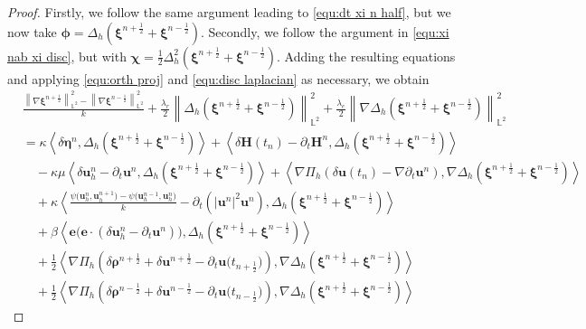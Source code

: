 \documentclass[11pt, reqno]{amsart}
\theoremstyle{definition}
\theoremstyle{remark}
\numberwithin{equation}{section}
\newcommand{\bff}{\boldsymbol}
\newcommand{\bb}{\mathbb}
\newcommand{\norm}[2]{\left\|{#1}\right\|_{#2}}
\newcommand{\inpro}[2]{\left\langle#1,#2\right\rangle}
\newcommand{\abs}[1]{\left|{#1}\right|}
\begin{document}
\begin{proof}
Firstly, we follow the same argument leading to \eqref{equ:dt xi n half}, but we now take $\bff{\phi}=\Delta_h \left(\bff{\xi}^{n+\frac{1}{2}}+ \bff{\xi}^{n-\frac{1}{2}}\right)$. Secondly, we follow the argument in \eqref{equ:xi nab xi disc}, but with $\bff{\chi}=\frac{1}{2} \Delta_h^2 \left(\bff{\xi}^{n+\frac{1}{2}}+ \bff{\xi}^{n-\frac{1}{2}}\right)$. Adding the resulting equations and applying \eqref{equ:orth proj} and \eqref{equ:disc laplacian} as necessary, we obtain
\begin{align}\label{equ:dt nab xi n half}
	\nonumber
	&\frac{\norm{\nabla \bff{\xi}^{n+\frac{1}{2}}}{\bb{L}^2}^2 - \norm{\nabla \bff{\xi}^{n-\frac{1}{2}}}{\bb{L}^2}^2}{k}
	+\frac{\lambda_r}{2} \norm{\Delta_h\left(\bff{\xi}^{n+\frac{1}{2}}+\bff{\xi}^{n-\frac{1}{2}}\right)}{\bb{L}^2}^2
	+
	\frac{\lambda_e}{2} \norm{\nabla \Delta_h\left(\bff{\xi}^{n+\frac{1}{2}}+\bff{\xi}^{n-\frac{1}{2}}\right)}{\bb{L}^2}^2
	\\
	\nonumber
	&=
	\kappa \inpro{\delta \bff{\eta}^n}{\Delta_h \left(\bff{\xi}^{n+\frac{1}{2}}+ \bff{\xi}^{n-\frac{1}{2}}\right)}
	+
	\inpro{\delta \bff{H}(t_n) - \partial_t \bff{H}^n}{\Delta_h \left(\bff{\xi}^{n+\frac{1}{2}}+ \bff{\xi}^{n-\frac{1}{2}}\right)}
	\\
	\nonumber
	&\quad
	-
	\kappa\mu \inpro{\delta \bff{u}_h^n-\partial_t \bff{u}^n}{\Delta_h \left(\bff{\xi}^{n+\frac{1}{2}}+ \bff{\xi}^{n-\frac{1}{2}}\right)}
	+
	\inpro{\nabla \Pi_h \left(\delta \bff{u}(t_n) - \nabla\partial_t \bff{u}^n\right)}{\nabla \Delta_h \left(\bff{\xi}^{n+\frac{1}{2}}+ \bff{\xi}^{n-\frac{1}{2}}\right)}
	\\
	\nonumber
	&\quad
	+
	\kappa
	\inpro{\frac{\psi\big(\bff{u}_h^n,\bff{u}_h^{n+1}\big) - \psi\big(\bff{u}_h^{n-1}, \bff{u}_h^n\big)}{k} - \partial_t \left(\abs{\bff{u}^n}^2 \bff{u}^n\right)}{\Delta_h \left(\bff{\xi}^{n+\frac{1}{2}}+ \bff{\xi}^{n-\frac{1}{2}}\right)}
	\\
	\nonumber
	&\quad
	+
	\beta
	\inpro{\bff{e}\big(\bff{e}\cdot(\delta\bff{u}_h^n-\partial_t \bff{u}^n)\big)}{\Delta_h \left(\bff{\xi}^{n+\frac{1}{2}}+ \bff{\xi}^{n-\frac{1}{2}}\right)}
	\\
	\nonumber
	&\quad
	+
	\frac{1}{2} \inpro{\nabla \Pi_h \left(\delta \bff{\rho}^{n+\frac{1}{2}}+ \delta \bff{u}^{n+\frac{1}{2}} - \partial_t \bff{u}\big(t_{n+\frac{1}{2}}\big)\right)}{\nabla \Delta_h\left(\bff{\xi}^{n+\frac{1}{2}}+\bff{\xi}^{n-\frac{1}{2}}\right)}
	\\
	\nonumber
	&\quad
	+
	\frac{1}{2} \inpro{\nabla \Pi_h \left(\delta \bff{\rho}^{n-\frac{1}{2}} + \delta \bff{u}^{n-\frac{1}{2}} - \partial_t \bff{u}\big(t_{n-\frac{1}{2}}\big)\right)}{\nabla \Delta_h\left(\bff{\xi}^{n+\frac{1}{2}}+\bff{\xi}^{n-\frac{1}{2}}\right)}

\end{align}
\end{proof}
\end{document}
